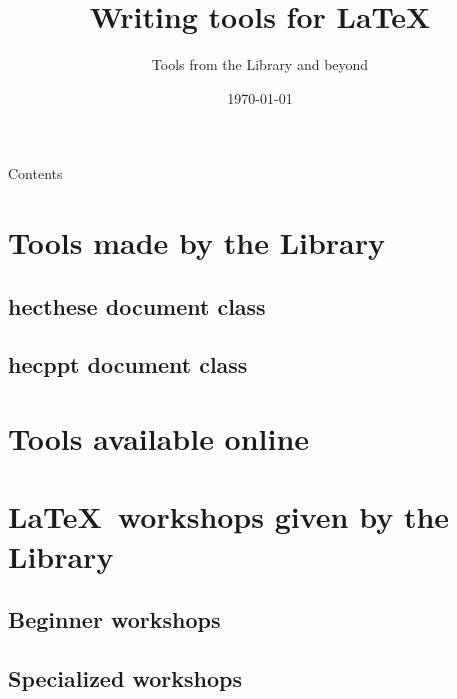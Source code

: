 \documentclass[aspectratio=1610,compress,t,gabaritb,french,english]{hecppt}
\title{Writing tools for {\LaTeX}}
\subtitle{Tools from the Library and beyond}
\date[]{\today}
\begin{document}
\pageTitre

\begin{frame}[c]{Contents}
	\tableofcontents
\end{frame}

\section{Tools made by the Library}

	\subsection{hecthese document class}

	\subsection{hecppt document class}
	
\section{Tools available online}

\section{\LaTeX\ workshops given by the Library}

	\subsection{Beginner workshops}
	
	\subsection{Specialized workshops}
\end{document}
